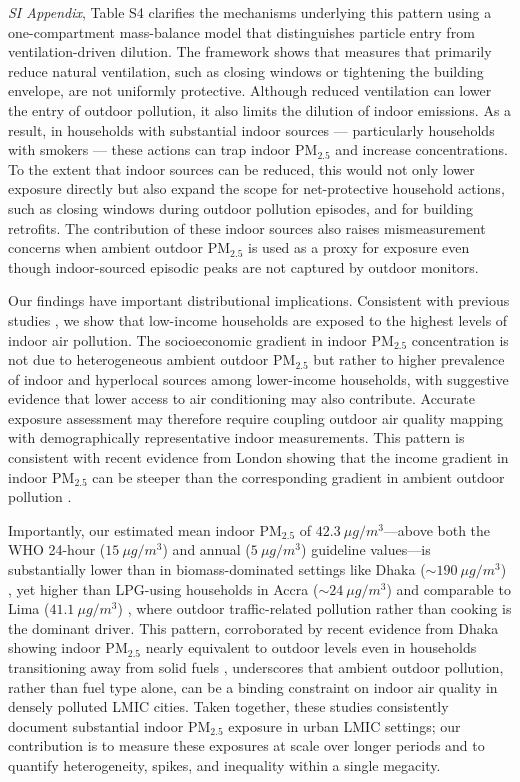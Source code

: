 \documentclass[9pt,twocolumn,twoside]{pnas-new}
\begin{document}
\textit{SI Appendix}, Table S4 clarifies the mechanisms underlying this pattern using a one-compartment mass-balance model that distinguishes particle entry from ventilation-driven dilution. The framework shows that measures that primarily reduce natural ventilation, such as closing windows or tightening the building envelope, are not uniformly protective. Although reduced ventilation can lower the entry of outdoor pollution, it also limits the dilution of indoor emissions. As a result, in households with substantial indoor sources — particularly households with smokers — these actions can trap indoor PM$_{2.5}$ and increase concentrations. To the extent that indoor sources can be reduced, this would not only lower exposure directly but also expand the scope for net-protective household actions, such as closing windows during outdoor pollution episodes, and for building retrofits. 
%
The contribution of these indoor sources also raises mismeasurement concerns when ambient outdoor PM$_{2.5}$ is used as a proxy for exposure even though indoor-sourced episodic peaks are not captured by outdoor monitors.

Our findings have important distributional implications. Consistent with previous studies \citep{greenstone_indoor_2021, burke_exposures_2022, ito_willingness_2020}, we show that low-income households are exposed to the highest levels of indoor air pollution. 
The socioeconomic gradient in indoor PM$_{2.5}$ concentration is not due to heterogeneous ambient outdoor PM$_{2.5}$ but rather to higher prevalence of indoor and hyperlocal sources among lower-income households, with suggestive evidence that lower access to air conditioning may also contribute.
Accurate exposure assessment may therefore require coupling outdoor air quality mapping with demographically representative indoor measurements. This pattern is consistent with recent evidence from London showing that the income gradient in indoor PM$_{2.5}$ can be steeper than the corresponding gradient in ambient outdoor pollution \citep{metcalfe_making_2025}.

Importantly, our estimated mean indoor PM$_{2.5}$ of $42.3~\mu g/m^3$—above both the WHO 24-hour ($15~\mu g/m^3$) and annual ($5~\mu g/m^3$) guideline values—is substantially lower than in biomass-dominated settings like Dhaka ($\sim 190~\mu g/m^3$) \citep{GURLEY201311}, yet higher than LPG-using households in Accra ($\sim 24~\mu g/m^3$) \citep{zhou2011household} and comparable to Lima ($41.1~\mu g/m^3$) \citep{kephart2020indoor}, where outdoor traffic-related pollution rather than cooking is the dominant driver. This pattern, corroborated by recent evidence from Dhaka showing indoor PM$_{2.5}$ nearly equivalent to outdoor levels even in households transitioning away from solid fuels \citep{Sahaetal2025}, underscores that ambient outdoor pollution, rather than fuel type alone, can be a binding constraint on indoor air quality in densely polluted LMIC cities. Taken together, these studies consistently document substantial indoor PM$_{2.5}$ exposure in urban LMIC settings; our contribution is to measure these exposures at scale over longer periods and to quantify heterogeneity, spikes, and inequality within a single megacity.
\end{document}
